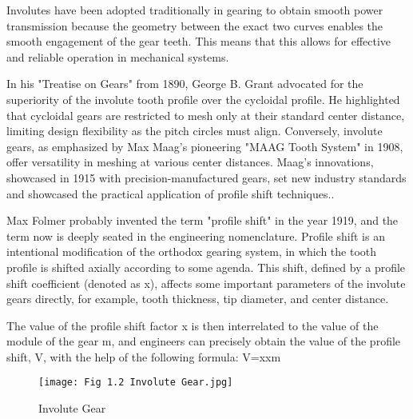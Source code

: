 \documentclass{article}
\begin{document}
Involutes have been adopted traditionally in gearing to obtain smooth power transmission because the geometry between the exact two curves enables the smooth engagement of the gear teeth. This means that this allows for effective and reliable operation in mechanical systems. 

In his "Treatise on Gears" from 1890, George B. Grant advocated for the superiority of the involute tooth profile over the cycloidal profile. He highlighted that cycloidal gears are restricted to mesh only at their standard center distance, limiting design flexibility as the pitch circles must align\cite{colbourne2012geometry2}. Conversely, involute gears, as emphasized by Max Maag's pioneering "MAAG Tooth System" in 1908, offer versatility in meshing at various center distances. Maag's innovations, showcased in 1915 with precision-manufactured gears, set new industry standards and showcased the practical application of profile shift techniques.\cite{MilleniumOutlook14}.

Max Folmer probably invented the term "profile shift" in the year 1919, and the term now is deeply seated in the engineering nomenclature. Profile shift is an intentional modification of the orthodox gearing system, in which the tooth profile is shifted axially according to some agenda. This shift, defined by a profile shift coefficient (denoted as x), affects some important parameters of the involute gears directly, for example, tooth thickness, tip diameter, and center distance\cite{MilleniumOutlook14}. 

The value of the profile shift factor x is then interrelated to the value of the module of the gear m, and engineers can precisely obtain the value of the profile shift, V, with the help of the following formula: V=xxm
 
\begin{figure}[h]
    \centering
    \texttt{[image: Fig 1.2 Involute Gear.jpg]}
    \caption { Involute Gear \cite{Profileshift-of-Involute-Gears5}}
    \label{fig:enter-label}
\end{figure}
\end{document}
